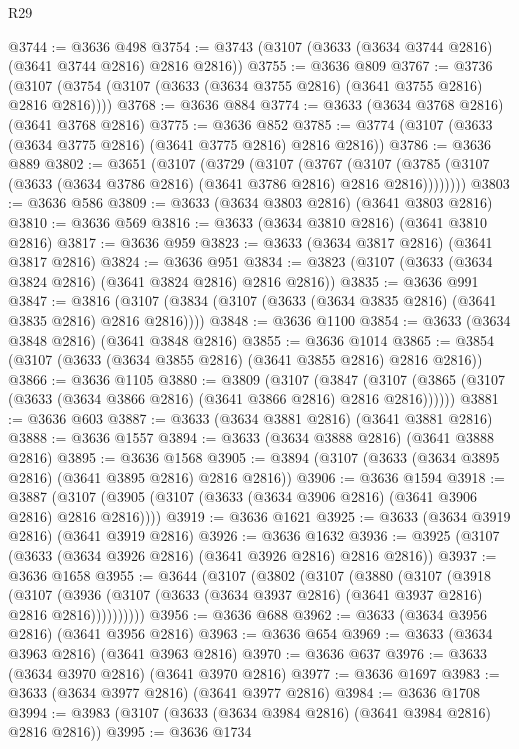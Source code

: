 \begin{lexlean}{R29}
\begin{coremodule}
@3744 := @3636 @498
@3754 := @3743 (@3107 (@3633 (@3634 @3744 @2816) (@3641 @3744 @2816) @2816 @2816))
@3755 := @3636 @809
@3767 := @3736 (@3107 (@3754 (@3107 (@3633 (@3634 @3755 @2816) (@3641 @3755 @2816) @2816 @2816))))
@3768 := @3636 @884
@3774 := @3633 (@3634 @3768 @2816) (@3641 @3768 @2816)
@3775 := @3636 @852
@3785 := @3774 (@3107 (@3633 (@3634 @3775 @2816) (@3641 @3775 @2816) @2816 @2816))
@3786 := @3636 @889
@3802 := @3651
    (@3107
      (@3729
        (@3107
          (@3767
            (@3107 (@3785 (@3107 (@3633 (@3634 @3786 @2816) (@3641 @3786 @2816) @2816 @2816))))))))
@3803 := @3636 @586
@3809 := @3633 (@3634 @3803 @2816) (@3641 @3803 @2816)
@3810 := @3636 @569
@3816 := @3633 (@3634 @3810 @2816) (@3641 @3810 @2816)
@3817 := @3636 @959
@3823 := @3633 (@3634 @3817 @2816) (@3641 @3817 @2816)
@3824 := @3636 @951
@3834 := @3823 (@3107 (@3633 (@3634 @3824 @2816) (@3641 @3824 @2816) @2816 @2816))
@3835 := @3636 @991
@3847 := @3816 (@3107 (@3834 (@3107 (@3633 (@3634 @3835 @2816) (@3641 @3835 @2816) @2816 @2816))))
@3848 := @3636 @1100
@3854 := @3633 (@3634 @3848 @2816) (@3641 @3848 @2816)
@3855 := @3636 @1014
@3865 := @3854 (@3107 (@3633 (@3634 @3855 @2816) (@3641 @3855 @2816) @2816 @2816))
@3866 := @3636 @1105
@3880 := @3809
    (@3107
      (@3847 (@3107 (@3865 (@3107 (@3633 (@3634 @3866 @2816) (@3641 @3866 @2816) @2816 @2816))))))
@3881 := @3636 @603
@3887 := @3633 (@3634 @3881 @2816) (@3641 @3881 @2816)
@3888 := @3636 @1557
@3894 := @3633 (@3634 @3888 @2816) (@3641 @3888 @2816)
@3895 := @3636 @1568
@3905 := @3894 (@3107 (@3633 (@3634 @3895 @2816) (@3641 @3895 @2816) @2816 @2816))
@3906 := @3636 @1594
@3918 := @3887 (@3107 (@3905 (@3107 (@3633 (@3634 @3906 @2816) (@3641 @3906 @2816) @2816 @2816))))
@3919 := @3636 @1621
@3925 := @3633 (@3634 @3919 @2816) (@3641 @3919 @2816)
@3926 := @3636 @1632
@3936 := @3925 (@3107 (@3633 (@3634 @3926 @2816) (@3641 @3926 @2816) @2816 @2816))
@3937 := @3636 @1658
@3955 := @3644
    (@3107
      (@3802
        (@3107
          (@3880
            (@3107
              (@3918
                (@3107
                  (@3936 (@3107 (@3633 (@3634 @3937 @2816) (@3641 @3937 @2816) @2816 @2816))))))))))
@3956 := @3636 @688
@3962 := @3633 (@3634 @3956 @2816) (@3641 @3956 @2816)
@3963 := @3636 @654
@3969 := @3633 (@3634 @3963 @2816) (@3641 @3963 @2816)
@3970 := @3636 @637
@3976 := @3633 (@3634 @3970 @2816) (@3641 @3970 @2816)
@3977 := @3636 @1697
@3983 := @3633 (@3634 @3977 @2816) (@3641 @3977 @2816)
@3984 := @3636 @1708
@3994 := @3983 (@3107 (@3633 (@3634 @3984 @2816) (@3641 @3984 @2816) @2816 @2816))
@3995 := @3636 @1734

\end{coremodule}
\end{lexlean}
